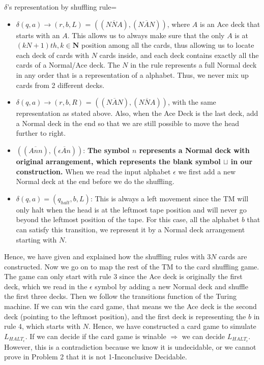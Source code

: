 \documentclass[11pt]{article}
\begin{document}
$\delta$'s representation by shuffling rule=
\begin{itemize}
\item $\delta(q,a) \rightarrow (r,b,L)$ = $((\overline{NNA}),(\overline{NAN}))$, where $A$ is an Ace deck that starts with an $A$. This allows us to always make sure that the only $A$ is at $(kN+1)th, k \in \mathbf{N}$ position among all the cards, thus allowing us to locate each deck of cards with $N$ cards inside, and each deck contains exactly all the cards of a Normal/Ace deck. The $N$ in the rule represents a full Normal deck in any order that is a representation of a alphabet. Thus, we never mix up cards from 2 different decks.
\item $\delta(q,a) \rightarrow (r,b,R)$ = $((\overline{NAN}),(\overline{NNA}))$, with the same representation as stated above. Also, when the Ace Deck is the last deck, add a Normal deck in the end so that we are still possible to move the head further to right.
\item $((\overline{Ann}),(\overline{\epsilon An}))$: \textbf{The symbol $n$ represents a Normal deck with original arrangement, which represents the blank symbol $\sqcup$ in our construction.} When we read the input alphabet $\epsilon$ we first add a new Normal deck at the end before we do the shuffling. 
\item $\delta(q,a) = (q_{halt},b,L)$: This is always a left movement since the TM will only halt when the head is at the leftmost tape position and will never go beyond the leftmost position of the tape. For this case, all the alphabet $b$ that can satisfy this transition, we represent it by a Normal deck arrangement starting with $N$.          
\end{itemize}

Hence, we have given and explained how the shuffling rules with $3N$ cards are constructed. Now we go on to map the rest of the TM to the card shuffling game.\\

The game can only start with rule 3 since the Ace deck is originally the first deck, which we read in the $\epsilon$ symbol by adding a new Normal deck and shuffle the first three decks. Then we follow the transitions function of the Turing machine. If we can win the card game, that means we the Ace deck is the second deck (pointing to the leftmost position), and the first deck is representing the $b$ in rule 4, which starts with $N$. Hence, we have constructed a card game to simulate $L_{{HALT}_{\epsilon}}$. If we can decide if the card game is winable $\Rightarrow$ we can decide $L_{{HALT}_{\epsilon}}$. However, this is a contradiction because we know it is undecidable, or we cannot prove in Problem 2 that it is not 1-Inconclusive Decidable.
\end{document}
